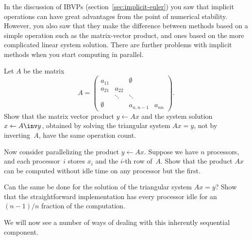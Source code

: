 
In the discussion of \acp{IBVP} (section~\ref{sec:implicit-euler}) you
saw that implicit operations can have great advantages from the point
of numerical stability. However, you also saw that they make the
difference between methods based on a simple operation such as the
matrix-vector product, and ones based on the more complicated linear
system solution. There are further problems with implicit methods when
you start computing in parallel.

\begin{exercise}
  Let $A$ be the matrix
  \begin{equation} A=
  \begin{pmatrix}
    a_{11}&&\emptyset\\ a_{21}&a_{22}\\ &\ddots&\ddots\\ 
    \emptyset&&a_{n,n-1}&a_{nn}
  \end{pmatrix}.\label{eq:ex:bidiagonal}
  \end{equation}
  Show that the matrix vector product $y\leftarrow Ax$ and the system
  solution $x\leftarrow A\inv y$, obtained by solving the
    triangular system $Ax=y$, not by inverting~$A$, have the same
  operation count.

  Now consider parallelizing the product $y\leftarrow Ax$. Suppose we
  have $n$ processors, and each processor~$i$ stores $x_i$ and the
  $i$-th row of~$A$. Show that the product $Ax$ can be computed without
  idle time on any processor but the first.

  Can the same be done for the solution of the triangular system
  $Ax=y$? Show that the straightforward implementation has every
  processor idle for an $(n-1)/n$ fraction of the computation.
\end{exercise}

We will now see a number of ways of dealing with this inherently
sequential component.

